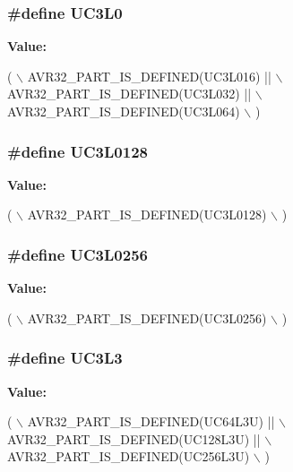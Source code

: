 \subsubsection[{U\+C3\+L0}]{\setlength{\rightskip}{0pt plus 5cm}\#define U\+C3\+L0}\label{group__uc3__part__macros__group_ga4a399e061cd2bf1088c01a22f69cf6c1}
{\bfseries Value\+:}
\begin{DoxyCode}
(   \(\backslash\)
        AVR32\_PART\_IS\_DEFINED(UC3L016) || \(\backslash\)
        AVR32\_PART\_IS\_DEFINED(UC3L032) || \(\backslash\)
        AVR32\_PART\_IS\_DEFINED(UC3L064) \(\backslash\)
        )
\end{DoxyCode}
\hypertarget{group__uc3__part__macros__group_ga2acf2e6f59e322e343123ad12fe89c2c}{}
\subsubsection[{U\+C3\+L0128}]{\setlength{\rightskip}{0pt plus 5cm}\#define U\+C3\+L0128}\label{group__uc3__part__macros__group_ga2acf2e6f59e322e343123ad12fe89c2c}
{\bfseries Value\+:}
\begin{DoxyCode}
( \(\backslash\)
        AVR32\_PART\_IS\_DEFINED(UC3L0128) \(\backslash\)
        )
\end{DoxyCode}
\hypertarget{group__uc3__part__macros__group_gaa8ab88d4e48e7936416c4475b42e5b49}{}
\subsubsection[{U\+C3\+L0256}]{\setlength{\rightskip}{0pt plus 5cm}\#define U\+C3\+L0256}\label{group__uc3__part__macros__group_gaa8ab88d4e48e7936416c4475b42e5b49}
{\bfseries Value\+:}
\begin{DoxyCode}
( \(\backslash\)
        AVR32\_PART\_IS\_DEFINED(UC3L0256) \(\backslash\)
        )
\end{DoxyCode}
\hypertarget{group__uc3__part__macros__group_gade3b8d2d26305ef47bb7b52212807e1d}{}
\subsubsection[{U\+C3\+L3}]{\setlength{\rightskip}{0pt plus 5cm}\#define U\+C3\+L3}\label{group__uc3__part__macros__group_gade3b8d2d26305ef47bb7b52212807e1d}
{\bfseries Value\+:}
\begin{DoxyCode}
(   \(\backslash\)
        AVR32\_PART\_IS\_DEFINED(UC64L3U)  || \(\backslash\)
        AVR32\_PART\_IS\_DEFINED(UC128L3U) || \(\backslash\)
        AVR32\_PART\_IS\_DEFINED(UC256L3U) \(\backslash\)
        )
\end{DoxyCode}
\hypertarget{group__uc3__part__macros__group_gae119ee2bcbfe63aa6cb0bc92245943f6}{}
